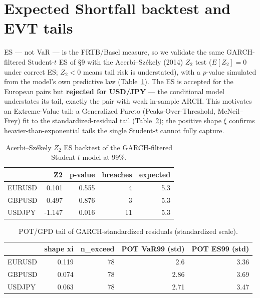 \documentclass[11pt,a4paper]{article}
\begin{document}
\section{Expected Shortfall backtest and EVT tails}\label{sec:es}
ES --- not VaR --- is the FRTB/Basel measure, so we validate the same GARCH-filtered Student-$t$ ES
of \S9 with the Acerbi--Székely (2014) $Z_2$ test ($E[Z_2]=0$ under correct ES; $Z_2<0$ means tail risk is understated),
with a $p$-value simulated from the model's own predictive law (Table~\ref{tab:esbt}). The ES is accepted
for the European pairs but \textbf{rejected for USD/JPY} --- the conditional model understates its tail,
exactly the pair with weak in-sample ARCH. This motivates an Extreme-Value tail: a Generalized Pareto
(Peaks-Over-Threshold, McNeil--Frey) fit to the standardized-residual tail (Table~\ref{tab:evt}); the
positive shape $\xi$ confirms heavier-than-exponential tails the single Student-$t$ cannot fully capture.
\begin{table}[H]\centering
\small
\caption{Acerbi--Székely $Z_2$ ES backtest of the GARCH-filtered Student-$t$ model at 99\%.}\label{tab:esbt}
\begin{tabular}{lrrrr}
\toprule
 & Z2 & p-value & breaches & expected \\
\midrule
EURUSD & 0.101 & 0.555 & 4 & 5.3 \\
GBPUSD & 0.497 & 0.876 & 3 & 5.3 \\
USDJPY & -1.147 & 0.016 & 11 & 5.3 \\
\bottomrule
\end{tabular}
\end{table}
\begin{table}[H]\centering
\small
\caption{POT/GPD tail of GARCH-standardized residuals (standardized scale).}\label{tab:evt}
\begin{tabular}{lrrrr}
\toprule
 & shape xi & n\_exceed & POT VaR99 (std) & POT ES99 (std) \\
\midrule
EURUSD & 0.119 & 78 & 2.6 & 3.36 \\
GBPUSD & 0.074 & 78 & 2.86 & 3.69 \\
USDJPY & 0.063 & 78 & 2.71 & 3.47 \\
\bottomrule
\end{tabular}
\end{table}
\end{document}
